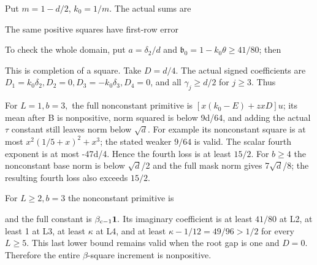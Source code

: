 Put \(m=1-d/2\), \(k_{0}=1/m\). The actual sums are



The same positive squares have first-row error



To check the whole domain, put \(a=\delta_2/d\) and \(\mathfrak{b}_0=1-k_{0} \theta\ge 41/80\); then



This is completion of a square. Take \(D=d/4.\) The actual signed coefficients are \(D_{1}=k_{0}\delta_2,\allowbreak \allowbreak  D_{2}=0,\allowbreak \allowbreak  D_{3}=-k_{0}\delta_3,\allowbreak \allowbreak  D_{4}=0\), and all \(\gamma_j\ge d/2\) for \(j\ge 3.\) Thus



For \(L=1,\allowbreak \allowbreak  b=3,\allowbreak \allowbreak  \) the full nonconstant primitive is \([x(k_{0}-E)+zxD]u\); its mean after B is nonpositive, norm squared is below 9d/64, and adding the actual \(\tau\) constant still leaves norm below \(\sqrt{d}\). For example its nonconstant square is at most \(x^2(1/5+x)^2+x^3\); the stated weaker \(9/64\) is valid. The scalar fourth exponent is at most -47d/4. Hence the fourth loss is at least \(15/2.\) For \(b\ge 4\) the nonconstant base norm is below \(\sqrt{d}\)/2 and the full mask norm gives 7\(\sqrt{d}\)/8; the resulting fourth loss also exceeds \(15/2.\)

For \(L\ge 2,\allowbreak \allowbreak  b=3\) the nonconstant primitive is



and the full constant is \(\beta_{c-1}\mathbf1.\) Its imaginary coefficient is at least \(41/80\) at L2, at least 1 at L3, at least \(\kappa\) at L4, and at least \(\kappa-1/12=49/96>1/2\) for every \(L\ge 5.\) This last lower bound remains valid when the root gap is one and \(D=0.\) Therefore the entire \(\beta\)-square increment is nonpositive.

